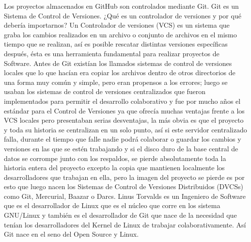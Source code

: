 \documentclass[twocolumns,a4paper]{IEEEtran}
\begin{document}
Los proyectos almacenados en GitHub son controlados mediante Git. Git es un
Sistema de Control de Versiones. ¿Qué es un controlador de versiones y por qué
debería importarnos? Un Controlador de versiones (VCS) es un sistema que graba
los cambios realizados en un archivo o conjunto de archivos en el mismo tiempo
que se realizan, así es posible rescatar distintas versiones específicas
después, ésta es una herramienta fundamental para realizar proyectos de
Software. Antes de Git existían los llamados sistemas de control de versiones
locales que lo que hacían era copiar los archivos dentro de otros directorios
de una forma muy común y simple, pero eran propensos a los errores; luego se
usaban los sistemas de control de versiones centralizados que fueron
implementados para permitir el desarrollo colaborativo y fue por mucho años el
estándar para el Control de Versiones ya que ofrecía muchas ventajas frente a
los VCS locales pero presentaban serias desventajas, la más obvia es que el
proyecto y toda su historia se centralizan en un solo punto, así si este
servidor centralizado falla, durante el tiempo que falle nadie podrá colaborar
o guardar los cambios y versiones en las que se estén trabajando y si el disco
duro de la base central de datos se corrompe junto con los respaldos, se pierde
absolutamente toda la historia entera del proyecto excepto la copia que
mantienen localmente los desarrolladores que trabajan en ella, pero la imagen
del proyecto se pierde es por esto que luego nacen los Sistemas de Control de
Versiones Distribuidos (DVCSs) como Git, Mercurial, Baazar o Darcs. Linus
Torvalds es un Ingeniero de Software que es el desarrollador de Linux que es el
núcleo que corre en los sistema GNU/Linux y también es el desarrollador de Git
que nace de la necesidad que tenían los desarrolladores del Kernel de Linux de
trabajar colaborativamente. Así Git nace en el seno del Open Source y
Linux\cite{ScottBenGit2014}.
\newline
\end{document}
